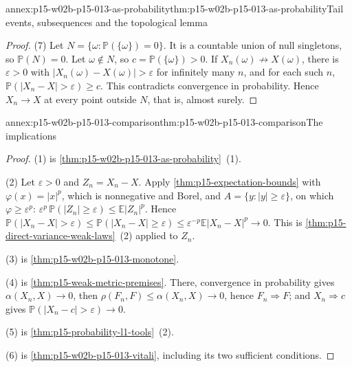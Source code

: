 \begin{annexitem}{annex:p15-w02b-p15-013-as-probability}{thm:p15-w02b-p15-013-as-probability}{Tail events, subsequences and the topological lemma}
\begin{proof}
(7) Let \(N=\{\omega:\mathbb P(\{\omega\})=0\}\). It is a countable
union of null singletons, so \(\mathbb P(N)=0\). Let
\(\omega\notin N\), so \(c=\mathbb P(\{\omega\})>0\). If
\(X_n(\omega)\not\to X(\omega)\), there is \(\varepsilon>0\) with
\(|X_n(\omega)-X(\omega)|>\varepsilon\) for infinitely many \(n\), and
for each such \(n\), \(\mathbb P(|X_n-X|>\varepsilon)\geq c\). This
contradicts convergence in probability. Hence \(X_n\to X\) at every
point outside \(N\), that is, almost surely.
\end{proof}
\end{annexitem}

\begin{annexitem}{annex:p15-w02b-p15-013-comparison}{thm:p15-w02b-p15-013-comparison}{The implications}
\begin{proof}
(1) is \cref{thm:p15-w02b-p15-013-as-probability}~(1).

(2) Let \(\varepsilon>0\) and \(Z_n=X_n-X\). Apply
\cref{thm:p15-expectation-bounds} with \(\varphi(x)=|x|^p\), which is
nonnegative and Borel, and \(A=\{y:|y|\geq\varepsilon\}\), on which
\(\varphi\geq\varepsilon^p\):
\(\varepsilon^p\,\mathbb P(|Z_n|\geq\varepsilon)\leq\mathbb E|Z_n|^p\).
Hence \(\mathbb P(|X_n-X|>\varepsilon)\leq
\mathbb P(|X_n-X|\geq\varepsilon)\leq\varepsilon^{-p}\mathbb E|X_n-X|^p\to0\).
This is \cref{thm:p15-direct-variance-weak-laws}~(2) applied to \(Z_n\).

(3) is \cref{thm:p15-w02b-p15-013-monotone}.

(4) is \cref{thm:p15-weak-metric-premises}. There, convergence in
probability gives \(\alpha(X_n,X)\to0\), then \(\rho(F_n,F)\leq\alpha(X_n,X)\to0\),
hence \(F_n\Rightarrow F\); and \(X_n\Rightarrow c\) gives
\(\mathbb P(|X_n-c|>\varepsilon)\to0\).

(5) is \cref{thm:p15-probability-l1-tools}~(2).

(6) is \cref{thm:p15-w02b-p15-013-vitali}, including its two
sufficient conditions.


\end{proof}
\end{annexitem}
